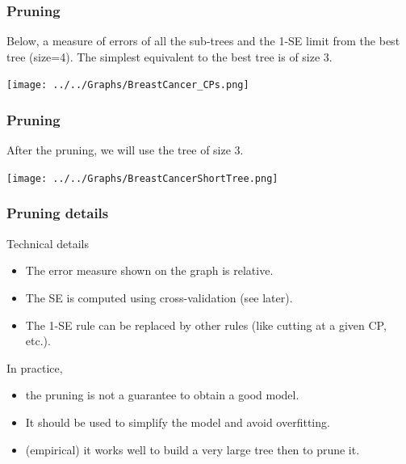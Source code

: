 \begin{frame}
\frametitle{Pruning}
Below, a measure of errors of all the sub-trees and the 1-SE limit from the best tree (size=4). The simplest equivalent to the best tree is of size 3.
\begin{center}
\texttt{[image: ../../Graphs/BreastCancer\_CPs.png]}
\end{center}
\end{frame}
\begin{frame}
\frametitle{Pruning}
After the pruning, we will use the tree of size 3.
\begin{center}
\texttt{[image: ../../Graphs/BreastCancerShortTree.png]}
\end{center}
\end{frame}
\begin{frame}
\frametitle{Pruning details}
Technical details
\begin{itemize}
\item The error measure shown on the graph is relative.
\item The SE is computed using cross-validation (see later).
\item The 1-SE rule can be replaced by other rules (like cutting at a given CP, etc.). 
\end{itemize}
In practice, 
\begin{itemize}
\item the pruning is not a guarantee to obtain a good model. 
\item It should be used to simplify the model and avoid overfitting.
\item (empirical) it works well to build a very large tree then to prune it.
\end{itemize}
\end{frame}
